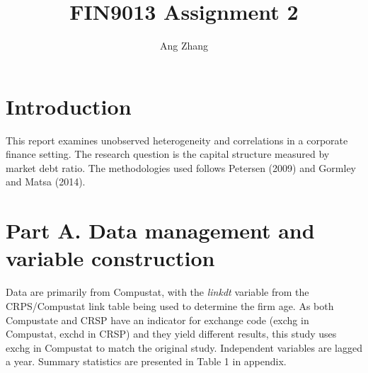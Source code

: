\documentclass{article}
\title{FIN9013 Assignment 2}
\author{Ang Zhang}
\begin{document}
\maketitle

\singlespacing

\section*{Introduction}
This report examines unobserved heterogeneity and correlations in a corporate finance setting. The research question is the capital structure measured by market debt ratio. The methodologies used follows Petersen (2009) and Gormley and Matsa (2014). \\
\section*{Part A. Data management and variable construction}
Data are primarily from Compustat, with the \textit{linkdt} variable from the CRPS/Compustat link table being used to determine the firm age. As both Compustate and CRSP have an indicator for exchange code (exchg in Compustat, exchd in CRSP) and they yield different results, this study uses exchg in Compustat to match the original study. Independent variables are lagged a year. Summary statistics are presented in Table 1 in appendix.\\
\end{document}
